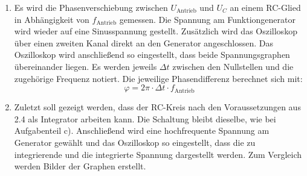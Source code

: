 \begin{enumerate}
    \item Es wird die Phasenverschiebung zwischen $U_{\text{Antrieb}}$ und $U_C$ an einem
    RC-Glied in Abhängigkeit von $f_{\text{Antrieb}}$ gemessen. Die Spannung am
    Funktiongenerator wird wieder auf eine Sinusspannung gestellt.
     Zusätzlich wird das Oszilloskop über einen zweiten Kanal direkt an den Generator angeschlossen.
     Das Oszilloskop wird anschließend so eingestellt, dass beide Spannungsgraphen
      übereinander liegen. Es werden jeweils $\Delta t$ zwischen den Nullstellen
      und die zugehörige Frequenz notiert. Die jeweilige
       Phasendifferenz berechnet sich mit:
       \begin{equation}
         \varphi = 2 \pi \cdot \Delta t \cdot f_{\text{Antrieb}}
       \end{equation}


       \item Zuletzt soll gezeigt werden, dass der RC-Kreis nach den Voraussetzungen aus 2.4 als
       Integrator arbeiten kann. Die Schaltung bleibt dieselbe, wie bei Aufgabenteil c).
       Anschließend wird eine hochfrequente Spannung am Generator gewählt und das Oszilloskop so eingestellt, dass
       die zu integrierende und die integrierte Spannung dargestellt werden. Zum Vergleich werden
       Bilder der Graphen erstellt.



\end{enumerate}
